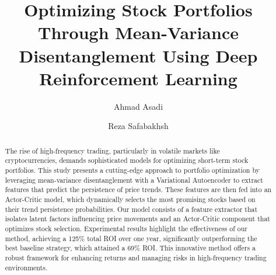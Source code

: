 \documentclass[preprint,review,12pt]{elsarticle}
\begin{document}
\begin{frontmatter}

\title{Optimizing Stock Portfolios Through Mean-Variance Disentanglement Using Deep Reinforcement Learning}

\author{Ahmad Asadi}%
\author{Reza Safabakhsh}




\address{Deep Learning Lab, Computer Engineering Department}
\address{Amirkabir University of Technology, Tehran, Iran.}

\begin{abstract}
The rise of high-frequency trading, particularly in volatile markets like cryptocurrencies, demands sophisticated models for optimizing short-term stock portfolios. This study presents a cutting-edge approach to portfolio optimization by leveraging mean-variance disentanglement with a Variational Autoencoder to extract features that predict the persistence of price trends. These features are then fed into an Actor-Critic model, which dynamically selects the most promising stocks based on their trend persistence probabilities. Our model consists of a feature extractor that isolates latent factors influencing price movements and an Actor-Critic component that optimizes stock selection. Experimental results highlight the effectiveness of our method, achieving a 125\% total ROI over one year, significantly outperforming the best baseline strategy, which attained a 69\% ROI. This innovative method offers a robust framework for enhancing returns and managing risks in high-frequency trading environments.
\end{abstract}





\end{frontmatter}
\end{document}
